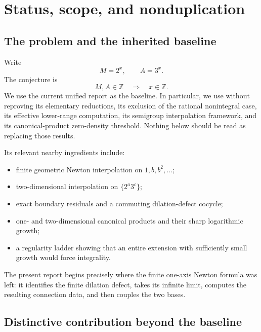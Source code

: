 \documentclass[11pt]{article}
\theoremstyle{definition}
\newcommand{\Z}{\mathbb{Z}}
\begin{document}
\tableofcontents
\newpage

\section{Status, scope, and nonduplication}

\subsection{The problem and the inherited baseline}

Write
\[
 M=2^x,\qquad A=3^x.
\]
The conjecture is
\[
 M,A\in\Z \quad\Longrightarrow\quad x\in\Z.
\]
We use the current unified report as the baseline.  In particular, we use without reproving
its elementary reductions, its exclusion of the rational nonintegral case, its effective
lower-range computation, its semigroup interpolation framework, and its canonical-product
zero-density threshold.  Nothing below should be read as replacing those results.

Its relevant nearby ingredients include:
\begin{itemize}
  \item finite geometric Newton interpolation on $1,b,b^2,\dots$;
  \item two-dimensional interpolation on $\{2^a3^c\}$;
  \item exact boundary residuals and a commuting dilation-defect cocycle;
  \item one- and two-dimensional canonical products and their sharp logarithmic growth;
  \item a regularity ladder showing that an entire extension with sufficiently small growth would force integrality.
\end{itemize}
The present report begins precisely where the finite one-axis Newton formula was left: it identifies the finite dilation defect, takes its infinite limit, computes the resulting connection data, and then couples the two bases.

\subsection{Distinctive contribution beyond the baseline}
\end{document}
